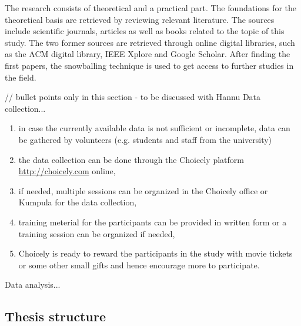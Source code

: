     The research consists of theoretical and a practical part. The foundations for the theoretical basis are retrieved by reviewing relevant literature. The sources include scientific journals, articles as well as books related to the topic of this study. The two former sources are retrieved through online digital libraries, such as the ACM digital library, IEEE Xplore and Google Scholar. After finding the first papers, the snowballing technique is used to get access to further studies in the field. 

    // bullet points only in this section - to be discussed with Hannu
    Data collection... 
    \begin{enumerate}
        \item in case the currently available data is not sufficient or incomplete, data can be gathered by volunteers (e.g. students and staff from the university)
        \item the data collection can be done through the Choicely platform \url{http://choicely.com} online,
        \item if needed, multiple sessions can be organized in the Choicely office or Kumpula for the data collection,
        \item training meterial for the participants can be provided in written form or a training session can be organized if needed,  
        \item Choicely is ready to reward the participants in the study with movie tickets or some other small gifts and hence encourage more to participate.
    \end{enumerate}

    Data analysis...

\subsection{Thesis structure}

